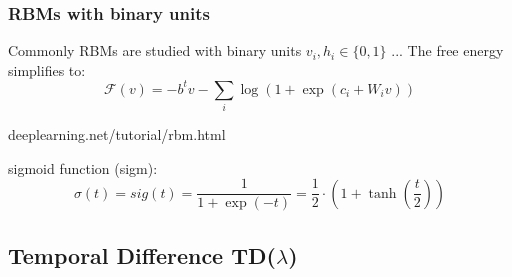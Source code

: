 \documentclass[11pt]{article}
\begin{document}
\subsubsection*{RBMs with binary units}
Commonly RBMs are studied with binary units $v_i, h_i \in \{0,1\}$ ...
The free energy simplifies to:\\
\[
	\mathcal{F}(v)=-b^{t}v-\sum_i\log(1+\exp(c_i+W_iv))
\]

deeplearning.net/tutorial/rbm.html

sigmoid function (sigm):
\[
	\sigma(t)=sig(t)=\frac{1}{1+\exp(-t)}=\frac{1}{2}\cdot(1+\tanh(\frac{t}{2}))
\]

\subsection{Temporal Difference TD($\lambda$)}
\end{document}
